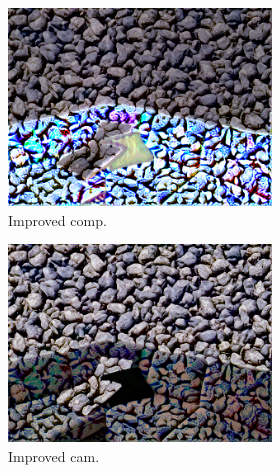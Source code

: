 \begin{figure}[]
\begin{subfigure}{\textwidth}
        \begin{subfigure}{0.24\textwidth}
            \centering
            \includegraphics[width=\textwidth]{images/04-experiment02/sofa/pebbles/improved_im.jpg}
            \caption*{Improved comp.}
        \end{subfigure}
        \hfill
        \begin{subfigure}{0.24\textwidth}
            \centering
            \includegraphics[width=\textwidth]{images/04-experiment02/sofa/pebbles/improved_proj.jpg}
            \caption*{Improved cam.}
        \end{subfigure}
        \hfill
        \begin{subfigure}{0.24\textwidth}
            \centering

\end{subfigure}
\end{subfigure}
\end{figure}
